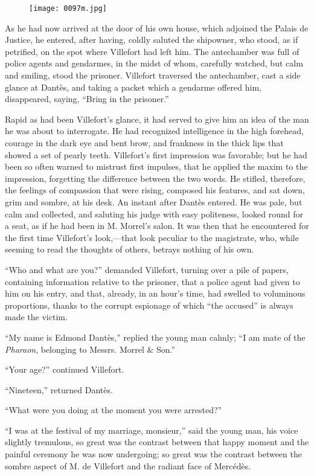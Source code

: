 \begin{figure}[h]
\texttt{[image: 0097m.jpg]}
\end{figure}

As he had now arrived at the door of his own house, which adjoined the
Palais de Justice, he entered, after having, coldly saluted the
shipowner, who stood, as if petrified, on the spot where Villefort had
left him. The antechamber was full of police agents and gendarmes, in
the midst of whom, carefully watched, but calm and smiling, stood the
prisoner. Villefort traversed the antechamber, cast a side glance at
Dantès, and taking a packet which a gendarme offered him, disappeared,
saying, “Bring in the prisoner.”

Rapid as had been Villefort’s glance, it had served to give him an idea
of the man he was about to interrogate. He had recognized intelligence
in the high forehead, courage in the dark eye and bent brow, and
frankness in the thick lips that showed a set of pearly teeth.
Villefort’s first impression was favorable; but he had been so often
warned to mistrust first impulses, that he applied the maxim to the
impression, forgetting the difference between the two words. He
stifled, therefore, the feelings of compassion that were rising,
composed his features, and sat down, grim and sombre, at his desk. An
instant after Dantès entered. He was pale, but calm and collected, and
saluting his judge with easy politeness, looked round for a seat, as if
he had been in M. Morrel’s salon. It was then that he encountered for
the first time Villefort’s look,—that look peculiar to the magistrate,
who, while seeming to read the thoughts of others, betrays nothing of
his own.

“Who and what are you?” demanded Villefort, turning over a pile of
papers, containing information relative to the prisoner, that a police
agent had given to him on his entry, and that, already, in an hour’s
time, had swelled to voluminous proportions, thanks to the corrupt
espionage of which “the accused” is always made the victim.

“My name is Edmond Dantès,” replied the young man calmly; “I am mate of
the \textit{Pharaon}, belonging to Messrs. Morrel \& Son.”

“Your age?” continued Villefort.

“Nineteen,” returned Dantès.

“What were you doing at the moment you were arrested?”

“I was at the festival of my marriage, monsieur,” said the young man,
his voice slightly tremulous, so great was the contrast between that
happy moment and the painful ceremony he was now undergoing; so great
was the contrast between the sombre aspect of M. de Villefort and the
radiant face of Mercédès.

